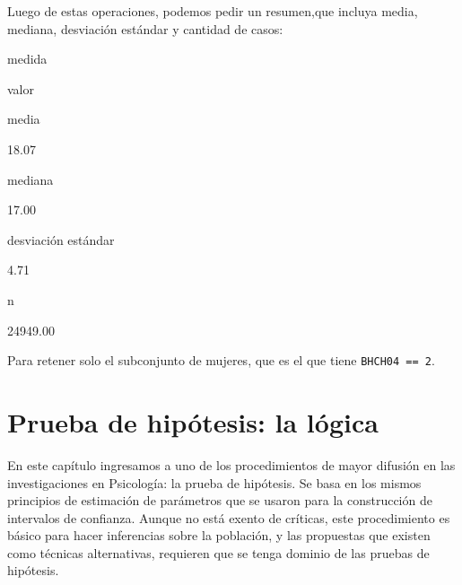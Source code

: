 \documentclass[]{book}
\newenvironment{Shaded}{\begin{snugshade}}{\end{snugshade}}
\newcommand{\DecValTok}[1]{\textcolor[rgb]{0.00,0.00,0.81}{#1}}
\newcommand{\KeywordTok}[1]{\textcolor[rgb]{0.13,0.29,0.53}{\textbf{#1}}}
\newcommand{\NormalTok}[1]{#1}
\newcommand{\OperatorTok}[1]{\textcolor[rgb]{0.81,0.36,0.00}{\textbf{#1}}}
\newcommand{\StringTok}[1]{\textcolor[rgb]{0.31,0.60,0.02}{#1}}
\begin{document}
Luego de estas operaciones, podemos pedir un resumen,que incluya media, mediana, desviación estándar y cantidad de casos:

\begin{Shaded}
\end{Shaded}

medida

valor

media

18.07

mediana

17.00

desviación estándar

4.71

n

24949.00

Para retener solo el subconjunto de mujeres, que es el que tiene \texttt{BHCH04\ ==\ 2}.

\hypertarget{prueba-de-hipuxf3tesis-la-luxf3gica}{%
\chapter{Prueba de hipótesis: la lógica}\label{prueba-de-hipuxf3tesis-la-luxf3gica}}

En este capítulo ingresamos a uno de los procedimientos de mayor
difusión en las investigaciones en Psicología: la prueba de hipótesis.
Se basa en los mismos principios de estimación de parámetros que se
usaron para la construcción de intervalos de confianza. Aunque no está
exento de críticas, este procedimiento es básico para hacer inferencias
sobre la población, y las propuestas que existen como técnicas
alternativas, requieren que se tenga dominio de las pruebas de
hipótesis.
\end{document}
